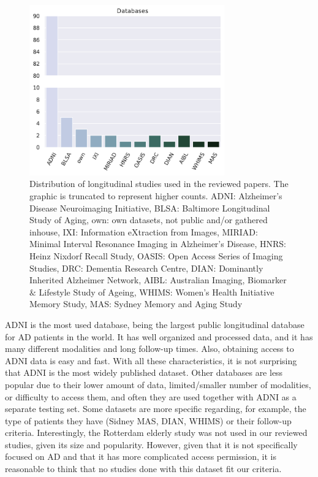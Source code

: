 \begin{figure}[!htbp]
  \centering
  \includegraphics[width=0.75\textwidth]{figures/review/Fig5.pdf}
  \caption[Distribution of longitudinal studies used in the reviewed papers.]{\small Distribution of longitudinal studies used in the reviewed papers. The graphic is truncated to represent higher counts. ADNI: Alzheimer's Disease Neuroimaging Initiative, BLSA: Baltimore Longitudinal Study of Aging, own: own datasets, not public and/or gathered inhouse, IXI: Information eXtraction from Images, MIRIAD: Minimal Interval Resonance Imaging in Alzheimer's Disease, HNRS: Heinz Nixdorf Recall Study, OASIS: Open Access Series of Imaging Studies, DRC: Dementia Research Centre, DIAN: Dominantly Inherited Alzheimer Network, AIBL: Australian Imaging, Biomarker $\&$ Lifestyle Study of Ageing, WHIMS: Women's Health Initiative Memory Study, MAS: Sydney Memory and Aging Study}\label{fig:db}
\end{figure}

ADNI \cite{Weiner2017} is the most used database, being the largest public longitudinal database for AD patients in the world. It has well organized and processed data, and it has many different modalities and long follow-up times. Also, obtaining access to ADNI data is easy and fast. With all these characteristics, it is not surprising that ADNI is the most widely published dataset. Other databases are less popular due to their lower amount of data, limited/smaller number of modalities, or difficulty to access them, and often they are used together with ADNI \cite{Davatzikos2009,Eshaghi2017,Franke2012} as a separate testing set. Some datasets are more specific regarding, for example, the type of patients they have (Sidney MAS, DIAN, WHIMS) or their follow-up criteria. Interestingly, the Rotterdam elderly study \cite{Ikram2017} was not used in our reviewed studies, given its size and popularity. However, given that it is not specifically focused on AD and that it has more complicated access permission, it is reasonable to think that no studies done with this dataset fit our criteria.  \\

